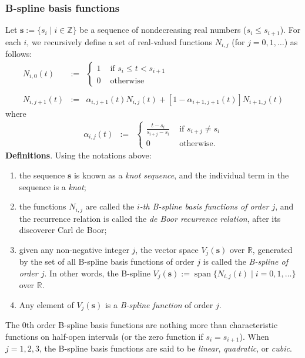 \documentclass[12pt]{article}
\begin{document}
\subsubsection*{B-spline basis functions}

Let $\boldsymbol{s}:=\lbrace s_i\mid i\in \mathbb{Z}\rbrace$ be a sequence of nondecreasing real numbers ($s_i\le s_{i+1}$).  For each $i$, we recursively define a set of real-valued functions $N_{i,j}$ (for $j=0,1,\ldots$) as follows:
\begin{eqnarray*}
N_{i,0}(t)&:=&\left\{
\begin{array}{ll}
1 & \mbox{ if } s_i\leq t<s_{i+1}\\
0 & \mbox{ otherwise }
\end{array}\right.\\
\\
N_{i,j+1}(t)&:=&\alpha_{i,j+1}(t) N_{i,j}(t) + [1-\alpha_{i+1,j+1}(t)] N_{i+1,j}(t)
\end{eqnarray*}
where
\begin{eqnarray*}
\alpha_{i,j}(t) &:=& \left\{
\begin{array}{ll}
\displaystyle{\frac{t - s_i}{s_{i+j} - s_i}} & \mbox{ if } s_{i+j}\ne s_i \\
0 & \mbox{ otherwise. }
\end{array}\right.
\end{eqnarray*}
\textbf{Definitions}.  Using the notations above:
\begin{enumerate}
\item
the sequence $\boldsymbol{s}$ is known as a \emph{knot sequence}, and the individual term in the sequence is a \emph{knot};  
\item the functions $N_{i,j}$ are called the \emph{$i$-th B-spline basis functions of order $j$}, and the recurrence relation is called the \emph{de Boor recurrence relation}, after its discoverer Carl de Boor;
\item 
given any non-negative integer $j$, the vector space $V_j(\boldsymbol{s})$ over $\mathbb{R}$, generated by the set of all B-spline basis functions of order $j$ is called the \emph{B-spline of order $j$}.  In other words, the B-spline $V_j(\boldsymbol{s}):=\operatorname{span}\lbrace N_{i,j}(t)\mid i=0,1,\ldots \rbrace$ over $\mathbb{R}$.  
\item 
Any element of $V_j(\boldsymbol{s})$ is a \emph{B-spline function} of order $j$.
\end{enumerate}

The $0$th order B-spline basis functions are nothing more than characteristic functions on half-open intervals (or the zero function if $s_i=s_{i+1}$).  When $j=1,2,3$, the B-spline basis functions are said to be \emph{linear}, \emph{quadratic}, or \emph{cubic}.
\end{document}
